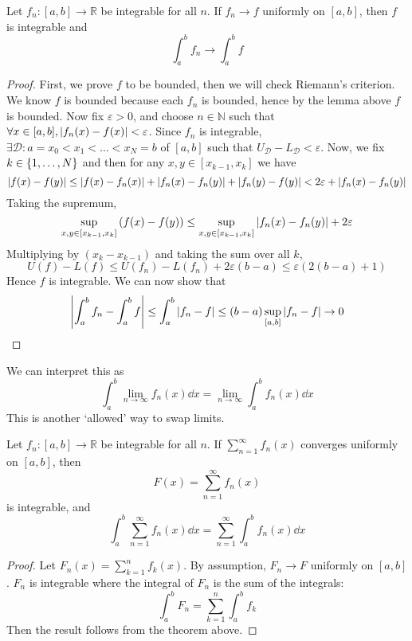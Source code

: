 \begin{theorem}
	Let \( f_n \colon [a,b] \to \mathbb R \) be integrable for all \( n \).
	If \( f_n \to f \) uniformly on \( [a,b] \), then \( f \) is integrable and
	\[
		\int_a^b f_n \to \int_a^b f
	\]
\end{theorem}
\begin{proof}
	First, we prove \( f \) to be bounded, then we will check Riemann's criterion.
	We know \( f \) is bounded because each \( f_n \) is bounded, hence by the lemma above \( f \) is bounded.
	Now fix \( \varepsilon > 0 \), and choose \( n \in \mathbb N \) such that \( \forall x \in [a,b], \abs{f_n(x) - f(x)} < \varepsilon \).
	Since \( f_n \) is integrable, \( \exists \mathcal D \colon a = x_0 < x_1 < \dots < x_N = b \) of \( [a,b] \) such that \( U_{\mathcal D} - L_{\mathcal D} < \varepsilon \).
	Now, we fix \( k \in \qty{1,\dots,N} \) and then for any \( x,y \in [x_{k-1}, x_k] \) we have
	\[
		\abs{f(x) - f(y)} \leq \abs{f(x) - f_n(x)} + \abs{f_n(x) - f_n(y)} + \abs{f_n(y) - f(y)} < 2\varepsilon + \abs{f_n(x) - f_n(y)}
	\]
	Taking the supremum,
	\[
		\sup_{x,y \in [x_{k-1},x_k]} \qty(f(x) - f(y)) \leq \sup_{x,y \in [x_{k-1},x_k]} \abs{f_n(x) - f_n(y)} + 2\varepsilon
	\]
	Multiplying by \( (x_k - x_{k-1}) \) and taking the sum over all \( k \),
	\[
		U(f) - L(f) \leq U(f_n) - L(f_n) + 2\varepsilon (b-a) \leq \varepsilon (2(b-a) + 1)
	\]
	Hence \( f \) is integrable.
	We can now show that
	\[
		\abs{\int_a^b f_n - \int_a^b f} \leq \int_a^b \abs{f_n - f} \leq (b-a) \sup_{[a,b]} \abs{f_n - f} \to 0
	\]
\end{proof}
\begin{remark}
	We can interpret this as
	\[
		\int_a^b \lim_{n \to \infty} f_n(x) \dd{x} = \lim_{n \to \infty} \int_a^b f_n(x) \dd{x}
	\]
	This is another `allowed' way to swap limits.
\end{remark}

\begin{corollary}
	Let \( f_n \colon [a,b] \to \mathbb R \) be integrable for all \( n \).
	If \( \sum_{n=1}^\infty f_n(x) \) converges uniformly on \( [a,b] \), then
	\[
		F(x) = \sum_{n=1}^\infty f_n(x)
	\]
	is integrable, and
	\[
		\int_a^b \sum_{n=1}^\infty f_n(x) \dd{x} = \sum_{n=1}^\infty \int_a^b f_n(x) \dd{x}
	\]
\end{corollary}
\begin{proof}
	Let \( F_n(x) = \sum_{k=1}^n f_k(x) \).
	By assumption, \( F_n \to F \) uniformly on \( [a,b] \).
	\( F_n \) is integrable where the integral of \( F_n \) is the sum of the integrals:
	\[
		\int_a^b F_n = \sum_{k=1}^n \int_a^b f_k
	\]
	Then the result follows from the theorem above.
\end{proof}

